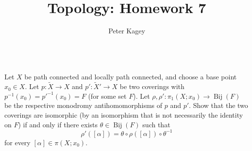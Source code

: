 \documentclass{article}
\newenvironment{problem}[2][Problem]{\begin{trivlist}
\item[\hskip \labelsep {\bfseries #1}\hskip \labelsep {\bfseries #2.}]}{\end{trivlist}}
\newcommand{\fn}[3]{#1 \colon #2 \rightarrow #3}
\newcommand{\inv}[1]{#1^{-1}}
\begin{document}
\title{Topology: Homework 7}
\author{Peter Kagey}

\maketitle

\begin{problem}{1} \text{} \\
  Let $X$ be path connected and locally path connected, and choose a base point
  $x_0 \in X$. Let $\fn{p}{\widetilde X}{X}$ and $\fn{p'}{\widetilde X'}{X}$ be
  two coverings with $\inv p(x_0) = \inv{p'}(x_0) = F$ (for some set $F$).
  Let $\fn{\rho, \rho'}{\pi_1(X; x_0)}{\operatorname{Bij}(F)}$ be the respective
  monodromy antihomomorphisms of $p$ and $p'$. Show that the two coverings are
  isomorphic (by an isomorphism that is not necessarily the identity on $F$)
  if and only if there exists $\theta \in \operatorname{Bij}(F)$ such that \[
    \rho'([\alpha]) = \theta \circ \rho([\alpha]) \circ \inv\theta
  \] for every $[\alpha] \in \pi(X; x_0)$.
\end{problem}
\end{document}
